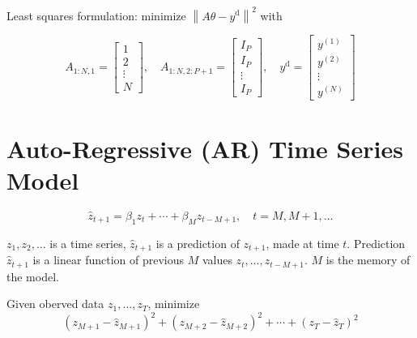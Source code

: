 \begin{problem}
    Least squares formulation: minimize $ \left\|A \theta-y^{\mathrm{d}}\right\|^{2} $ with

\begin{equation} A_{1: N, 1}=\left[\begin{array}{c}1 \\ 2 \\ \vdots \\ N\end{array}\right], \quad A_{1: N, 2: P+1}=\left[\begin{array}{c}I_{P} \\ I_{P} \\ \vdots \\ I_{P}\end{array}\right], \quad y^{\mathrm{d}}=\left[\begin{array}{c}y^{(1)} \\ y^{(2)} \\ \vdots \\ y^{(N)}\end{array}\right] \end{equation}
\end{problem}



\section{Auto-Regressive (AR) Time Series Model}

\begin{problem}
    \begin{equation}
\hat{z}_{t+1}=\beta_{1} z_{t}+\cdots+\beta_{M} z_{t-M+1}, \quad t=M, M+1, \ldots
\end{equation}

$ z_{1}, z_{2}, \ldots $ is a time series, $ \hat{z}_{t+1} $ is a prediction of $ z_{t+1} $, made at time $ t $. Prediction $ \hat{z}_{t+1} $ is a linear function of previous $ M $ values $ z_{t}, \ldots, z_{t-M+1} $. $ M $ is the memory of the model.
\end{problem}

\begin{problem}
    
    Given oberved data $ z_{1}, \ldots, z_{T} $, minimize
\begin{equation}
\left(z_{M+1}-\hat{z}_{M+1}\right)^{2}+\left(z_{M+2}-\hat{z}_{M+2}\right)^{2}+\cdots+\left(z_{T}-\hat{z}_{T}\right)^{2}
\end{equation}
\end{problem}


